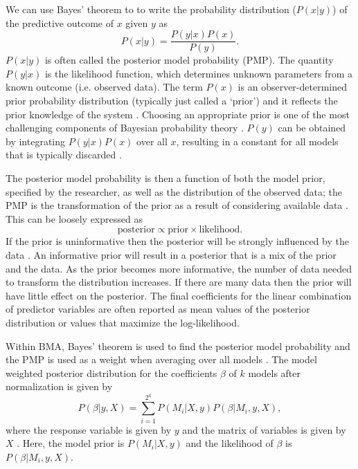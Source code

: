\documentclass{sfuthesis}
\begin{document}
We can use Bayes' theorem to to write the probability distribution ($P(x|y)$) of the predictive outcome of $x$ given $y$ as
\begin{equation}
P(x|y) = \frac{P(y|x)P(x)}{P(y)}.
\end{equation}
$P(x|y)$ is often called the posterior model probability (PMP). The quantity $P(y|x)$ is the likelihood function, which determines unknown parameters from a known outcome (i.e. observed data). The term $P(x)$ is an observer-determined prior probability distribution (typically just called a `prior') and it reflects the prior knowledge of the system \citep{Raftery1997}. Choosing an appropriate prior is one of the most challenging components of Bayesian probability theory \citep{Wasserman2000}. $P(y)$ can be obtained by integrating $P(y|x)P(x)$ over all $x$, resulting in a constant for all models that is typically discarded \citep{Wasserman2000}. 

The posterior model probability is then a function of both the model prior, specified by the researcher, as well as the distribution of the observed data; the PMP is the transformation of the prior as a result of considering available data \citep{Wasserman2000}. This can be loosely expressed as
\begin{equation}
\textrm{posterior} \propto \textrm{prior} \times \textrm{likelihood}.
\end{equation}
If the prior is uninformative then the posterior will be strongly influenced by the data \citep{Wasserman2000}. An informative prior will result in a posterior that is a mix of the prior and the data. As the prior becomes more informative, the number of data needed to transform the distribution increases. If there are many data then the prior will have little effect on the posterior. The final coefficients for the linear combination of predictor variables are often reported as mean values of the posterior distribution or values that maximize the log-likelihood. 

Within BMA, Bayes' theorem is used to find the posterior model probability and the PMP is used as a weight when averaging over all models \citep{Wasserman2000}. The model weighted posterior distribution for the coefficients $\beta$ of $k$ models after normalization is given by 
\begin{equation}
P(\beta| y,X) = \sum\limits_{i=1}^{2^k} P(M_i | X,y)P(\beta | M_i , y, X),
\end{equation}
where the response variable is given by $y$ and the matrix of variables is given by $X$ \citep{Raftery1997}. Here, the model prior is $P(M_i | X,y)$ and the likelihood of $\beta$ is $P(\beta | M_i , y, X)$.
\end{document}

